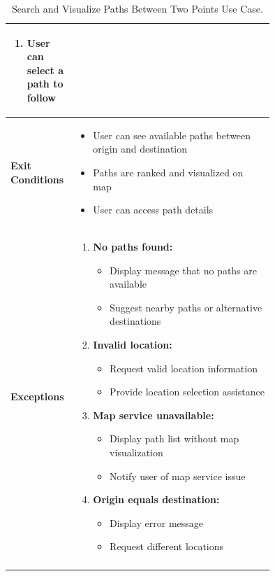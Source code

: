 \begin{center}
\begin{longtable}{|l|p{0.75\linewidth}|}
\begin{enumerate}
\begin{itemize}
            \end{itemize}
            \item User can select a path to follow
        \end{enumerate} \\
        \hline
        \textbf{Exit Conditions}   & 
        \begin{itemize}
            \item User can see available paths between origin and destination
            \item Paths are ranked and visualized on map
            \item User can access path details
        \end{itemize} \\
        \hline
        \textbf{Exceptions}       & 
        \begin{enumerate}
            \item \textbf{No paths found:}
            \begin{itemize}
                \item Display message that no paths are available
                \item Suggest nearby paths or alternative destinations
            \end{itemize}
            \item \textbf{Invalid location:}
            \begin{itemize}
                \item Request valid location information
                \item Provide location selection assistance
            \end{itemize}
            \item \textbf{Map service unavailable:}
            \begin{itemize}
                \item Display path list without map visualization
                \item Notify user of map service issue
            \end{itemize}
            \item \textbf{Origin equals destination:}
            \begin{itemize}
                \item Display error message
                \item Request different locations
            \end{itemize}
        \end{enumerate} \\
        \hline
        \caption{Search and Visualize Paths Between Two Points Use Case.}
        \label{tab:search_paths_use_case}
    \end{longtable}
\end{center}

